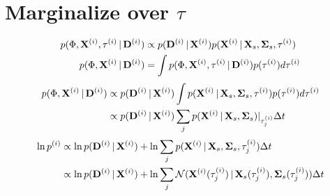 \documentclass[letterpaper,12pt,preprint]{aastex}
\newcommand{\given}{\,|\,}
\newcommand{\D}{{\bf D}}
\newcommand{\X}{{\bf X}}
\newcommand{\bSigma}{{\bf \Sigma}}
\begin{document}
\section{Marginalize over $\tau$}
\begin{align}
	p(\Phi, \X^{(i)}, \tau^{(i)} \given \D^{(i)}) &\propto 
		p(\D^{(i)} \given \X^{(i)}) p(\X^{(i)} \given \X_s, \bSigma_s, \tau^{(i)})\\
	p(\Phi, \X^{(i)} \given \D^{(i)}) &= \int p(\Phi, \X^{(i)}, \tau^{(i)} \given \D^{(i)}) p(\tau^{(i)}) d\tau^{(i)}
\end{align}	
\begin{align}
	p(\Phi, \X^{(i)} \given \D^{(i)}) &\propto p(\D^{(i)} \given \X^{(i)}) \int p(\X^{(i)} \given \X_s, \bSigma_s, \tau^{(i)}) p(\tau^{(i)}) d\tau^{(i)}\\
	&\propto p(\D^{(i)} \given \X^{(i)}) \sum_j p(\X^{(i)} \given \X_s, \bSigma_s)|_{\tau^{(i)}_j} \Delta t
\end{align}
\begin{align}
	\ln p^{(i)} &\propto \ln p(\D^{(i)} \given \X^{(i)}) + \ln \sum_j p(\X^{(i)} \given \X_s, \bSigma_s, \tau^{(i)}_j) \Delta t\\
	&\propto \ln p(\D^{(i)} \given \X^{(i)}) + \ln \sum_j \mathcal{N}(\X^{(i)}( \tau^{(i)}_j) \given \X_s( \tau^{(i)}_j), \bSigma_s( \tau^{(i)}_j)) \Delta t\\
\end{align}
\end{document}
